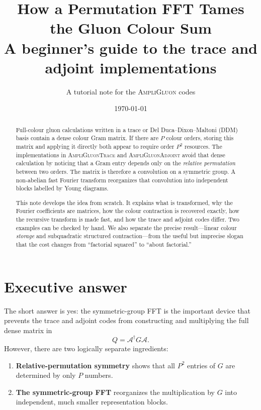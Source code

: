 \documentclass[11pt,a4paper]{article}
\title{How a Permutation FFT Tames the Gluon Colour Sum\\
\large A beginner's guide to the trace and adjoint implementations}
\author{A tutorial note for the \textsc{AmpliGluon} codes}
\date{\today}
\newcommand{\cA}{\mathcal{A}}
\begin{document}
\maketitle

\begin{abstract}
Full-colour gluon calculations written in a trace or Del Duca--Dixon--Maltoni
(DDM) basis contain a dense colour Gram matrix.  If there are $P$ colour
orders, storing this matrix and applying it directly both appear to require
order $P^2$ resources.  The implementations in \textsc{AmpliGluonTrace} and
\textsc{AmpliGluonAdjoint} avoid that dense calculation by noticing that a
Gram entry depends only on the \emph{relative permutation} between two
orders.  The matrix is therefore a convolution on a symmetric group.  A
non-abelian fast Fourier transform reorganizes that convolution into
independent blocks labelled by Young diagrams.

This note develops the idea from scratch.  It explains what is transformed,
why the Fourier coefficients are matrices, how the colour contraction is
recovered exactly, how the recursive transform is made fast, and how the
trace and adjoint codes differ.  Two examples can be checked by hand.  We
also separate the precise result---linear colour \emph{storage} and
subquadratic structured contraction---from the useful but imprecise slogan
that the cost changes from ``factorial squared'' to ``about factorial.''
\end{abstract}

\tableofcontents

\section{Executive answer}

The short answer is yes: the symmetric-group FFT is the important device
that prevents the trace and adjoint codes from constructing and multiplying
the full dense matrix in
\begin{equation}
  Q = \cA^\dagger G\cA.
  \label{eq:headline}
\end{equation}
However, there are two logically separate ingredients:

\begin{enumerate}
  \item \textbf{Relative-permutation symmetry} shows that all $P^2$
        entries of $G$ are determined by only $P$ numbers.
  \item \textbf{The symmetric-group FFT} reorganizes the multiplication by
        $G$ into independent, much smaller representation blocks.
\end{enumerate}
\end{document}
